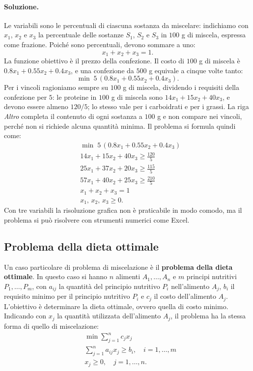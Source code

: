 \paragraph{Soluzione.}
Le variabili sono le percentuali di ciascuna sostanza da miscelare: indichiamo con $x_1$, $x_2$ e $x_3$ la percentuale delle sostanze $S_1$, $S_2$ e $S_3$ in $100$ g di miscela, espressa come frazione. Poiché sono percentuali, devono sommare a uno:
\[
x_1 + x_2 + x_3 = 1.
\]
La funzione obiettivo è il prezzo della confezione. Il costo di $100$ g di miscela è $0.8x_1 + 0.55x_2 + 0.4x_3$, e una confezione da $500$ g equivale a cinque volte tanto:
\[
\min \; 5\,(0.8x_1 + 0.55x_2 + 0.4x_3).
\]
Per i vincoli ragioniamo sempre su $100$ g di miscela, dividendo i requisiti della confezione per $5$: le proteine in $100$ g di miscela sono $14x_1 + 15x_2 + 40x_3$, e devono essere almeno $120/5$; lo stesso vale per i carboidrati e per i grassi. La riga \emph{Altro} completa il contenuto di ogni sostanza a $100$ g e non compare nei vincoli, perché non si richiede alcuna quantità minima. Il problema si formula quindi come:
\[
\begin{aligned}
&\min \; 5\,(0.8x_1 + 0.55x_2 + 0.4x_3) \\
&14x_1 + 15x_2 + 40x_3 \ge \tfrac{120}{5} \\
&25x_1 + 37x_2 + 20x_3 \ge \tfrac{115}{5} \\
&57x_1 + 40x_2 + 25x_3 \ge \tfrac{210}{5} \\
&x_1 + x_2 + x_3 = 1 \\
&x_1,\, x_2,\, x_3 \ge 0.
\end{aligned}
\]
Con tre variabili la risoluzione grafica non è praticabile in modo comodo, ma il problema si può risolvere con strumenti numerici come Excel.

\subsection{Problema della dieta ottimale}
Un caso particolare di problema di miscelazione è il \textbf{problema della dieta ottimale}. In questo caso si hanno $n$ alimenti $A_1, \dots, A_n$ e $m$ principi nutritivi $P_1, \dots, P_m$, con $a_{ij}$ la quantità del principio nutritivo $P_i$ nell'alimento $A_j$, $b_i$ il requisito minimo per il principio nutritivo $P_i$ e $c_j$ il costo dell'alimento $A_j$. L'obiettivo è determinare la dieta ottimale, ovvero quella di costo minimo. Indicando con $x_j$ la quantità utilizzata dell'alimento $A_j$, il problema ha la stessa forma di quello di miscelazione:
\[
\begin{aligned}
&\min \sum_{j=1}^{n} c_j x_j \\
&\sum_{j=1}^{n} a_{ij} x_j \ge b_i, \quad i = 1, \dots, m \\
&x_j \ge 0, \quad j = 1, \dots, n.
\end{aligned}
\]

